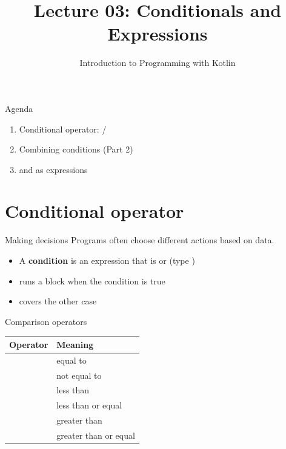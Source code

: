 \documentclass[aspectratio=169,11pt]{beamer}
\title{Lecture 03: Conditionals and Expressions}
\subtitle{Introduction to Programming with Kotlin}
\begin{document}
    \begin{frame}
        \titlepage
    \end{frame}

    \begin{frame}{Agenda}
        \begin{enumerate}
            \item Conditional operator:  / 
            \item Combining conditions (Part 2)
            \item {} and  as expressions
        \end{enumerate}
    \end{frame}

    \section{Conditional operator}

    \begin{frame}{Making decisions}
        Programs often choose different actions based on data.
        \vspace{0.6em}
        \begin{itemize}
            \item A \textbf{condition} is an expression that is  or 
              (type )
            \item {} runs a block when the condition is true
            \item {} covers the other case
        \end{itemize}
    \end{frame}

    \begin{frame}{Comparison operators}
        \begin{tabular}{ll}
            \toprule
            Operator & Meaning \\
            \midrule
            \kotlincode{==} & equal to \\
            \kotlincode{!=} & not equal to \\
            \kotlincode{<} & less than \\
            \kotlincode{<=} & less than or equal \\
            \kotlincode{>} & greater than \\
            \kotlincode{>=} & greater than or equal \\
            \bottomrule
        \end{tabular}
        \vspace{0.6em}
    \end{frame}
\end{document}
